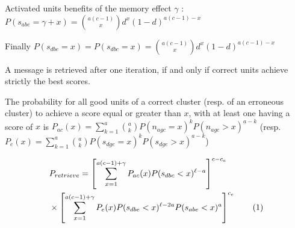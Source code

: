 \documentclass[english,10pt,twocolumn]{IEEEtran}
\newcommand\numberthis{\addtocounter{equation}{1}\tag{\theequation}}
\theoremstyle{definition}
\begin{document}
	
	Activated units benefits of the memory effect $\gamma$ :	\\
	$P(s_{abe} = \gamma + x) = {a(c - 1) \choose x} d^x (1-d)^{a(c-1)-x}$
	
	
	Finally $P(s_{dbe} = x) = P(s_{dbc} = x) = {a(c - 1) \choose x} d^x (1-d)^{a(c- 1) -x}$	
	
	A message is retrieved after one iteration, if and only if correct units achieve strictly the best scores.	
	
	

	
	
	
	
	The probability for all good units of a correct cluster (resp. of an erroneous cluster) to achieve a score equal or greater than $x$, with at least one having a score of $x$ is $P_{ac} (x) = \sum_{k = 1}^{a} { a \choose k }   P(n_{agc} = x)^k P(n_{agc} > x)^{a-k}$ (resp. $P_e(x) = \sum_{k = 1}^a { a \choose k } P(s_{dge} = x)^k P(s_{dge} > x)^{a-k}$)

	
	
		\begin{align*}
	&P_{retrieve} = \left [ \sum_{x = 1}^{a(c-1) + \gamma} P_{ac}(x) P(s_{dbc} < x)^{\ell-a} \right ]^{c - c_e}\\ 
	 &\times \left [ \sum_{x = 1}^{a(c-1) +\gamma} P_e(x) P(s_{dbe} < x)^{\ell-2a} P(s_{abe} < x)^a \right ]^{c_e} \numberthis \label{from_err_th}
	\end{align*}
	
\end{document}
